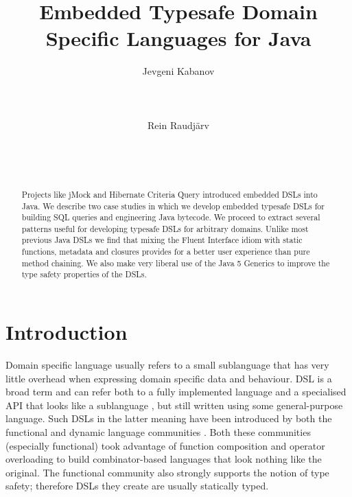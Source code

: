 \documentclass{sig-alternate}
\begin{document}
\title{Embedded Typesafe Domain Specific Languages for Java} 

\author{
	\alignauthor 
		Jevgeni Kabanov\\
       \\
       \\
       \\
	\alignauthor 
		Rein Raudj\"arv\\
       \\
       \\
       \\
}

\date{}

\maketitle

\begin{abstract}
Projects like jMock and Hibernate Criteria Query introduced embedded DSLs into Java. We describe two case studies in which we develop embedded typesafe DSLs for building SQL queries and engineering Java bytecode. We proceed to extract several patterns useful for developing typesafe DSLs for arbitrary domains. Unlike most previous Java DSLs we find that mixing the Fluent Interface idiom with static functions, metadata and closures provides for a better user experience than pure method chaining. We also make very liberal use of the Java 5 Generics to improve the type safety properties of the DSLs.
\end{abstract}


\section{Introduction}

Domain specific language usually refers to a small sublanguage that has very little overhead when expressing domain specific data and behaviour. DSL is a broad term \cite{vandeursen2000dsl,bentley1999pp} and can refer both to a fully implemented language and a specialised API that looks like a sublanguage \cite{hudak1996}, but still written using some general-purpose language. Such DSLs in the latter meaning have been introduced by both the functional \cite{bringert2004sph} and dynamic language communities \cite{cuadrado2007bds}. Both these communities (especially functional) took advantage of function composition and operator overloading to build combinator-based languages that look nothing like the original. The functional community also strongly supports the notion of type safety; therefore DSLs they create are usually statically typed.
\end{document}
